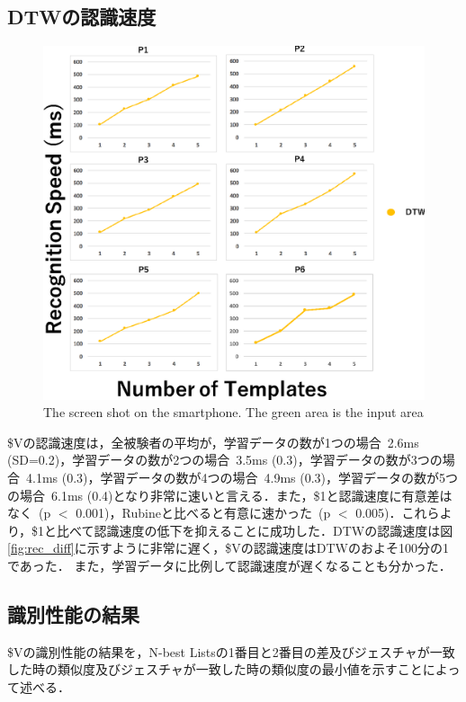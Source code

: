 \subsection{DTWの認識速度}
\begin{figure}[!h]
\centering
\includegraphics[width=1.0\columnwidth]{img/rec_speed_dtw.eps}
\caption{The screen shot on the smartphone. The green area is the input area}
\label{fig:rare_rec}
\end{figure}


\$Vの認識速度は，全被験者の平均が，学習データの数が1つの場合~2.6ms (SD=0.2)，学習データの数が2つの場合~3.5ms (0.3)，学習データの数が3つの場合~4.1ms (0.3)，学習データの数が4つの場合~4.9ms (0.3)，学習データの数が5つの場合~6.1ms (0.4)となり非常に速いと言える．また，\$1と認識速度に有意差はなく~(p $<$ 0.001)，Rubineと比べると有意に速かった~(p $<$ 0.005)．これらより，\$1と比べて認識速度の低下を抑えることに成功した．DTWの認識速度は図\ref{fig:rec_diff}に示すように非常に遅く，\$Vの認識速度はDTWのおよそ100分の1であった．
また，学習データに比例して認識速度が遅くなることも分かった．

\subsection{識別性能の結果}
\$Vの識別性能の結果を，N-best Listsの1番目と2番目の差及びジェスチャが一致した時の類似度及びジェスチャが一致した時の類似度の最小値を示すことによって述べる．

